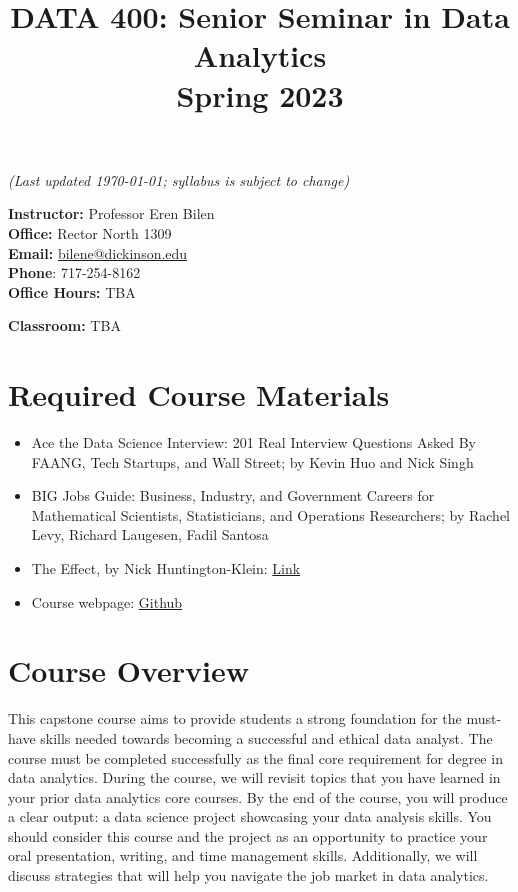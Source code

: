 \documentclass[11pt,letter]{article}
\title{{\sffamily\large\textbf{DATA 400: Senior Seminar in Data Analytics}\\ \ttfamily Spring 2023}}
\date{}
\begin{document}
\faketableofcontents


\maketitle

\vspace{-10em}



\textit{(Last updated \today{}; syllabus is subject to change)}




\begin{minipage}[t]{0.61\linewidth}
\textbf{Instructor:} Professor Eren Bilen\\
\textbf{Office:} Rector North 1309\\
\textbf{Email:} \href{bilene@dickinson.edu}{bilene@dickinson.edu} \\
\textbf{Phone}: 717-254-8162\\
\textbf{Office Hours:} TBA
\end{minipage}
\begin{minipage}[t]{0.4\linewidth}
\textbf{Classroom:} TBA
\hspace{1em}\\
\end{minipage}

\section*{Required Course Materials}
\begin{itemize}[nosep]
	\item Ace the Data Science Interview: 201 Real Interview Questions Asked By FAANG, Tech Startups, and Wall Street; by Kevin Huo and Nick Singh
\item BIG Jobs Guide: Business, Industry, and Government Careers for Mathematical Scientists, Statisticians, and Operations Researchers; by Rachel Levy, Richard Laugesen, Fadil Santosa
\item The Effect, by Nick Huntington-Klein: \href{https://theeffectbook.net}{Link}
\item Course webpage: \href{https://github.com/ernbilen/Data400_Spring23}{Github}
\end{itemize}




\section*{Course Overview}
This capstone course aims to provide students a strong foundation for the must-have skills needed towards becoming a successful and ethical data analyst. The course must be completed successfully as the final core requirement for degree in data analytics. During the course, we will revisit topics that you have learned in your prior data analytics core courses. By the end of the course, you will produce a clear output: a data science project showcasing your data analysis skills. You should consider this course and the project as an opportunity to practice your oral presentation, writing, and time management skills. Additionally, we will discuss strategies that will help you navigate the job market in data analytics.
\end{document}
